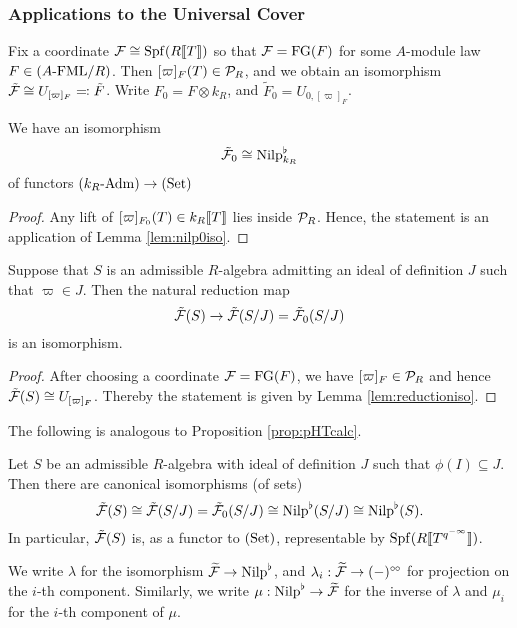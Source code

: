 \documentclass[../main.tex]{subfiles}
\begin{document}
\subsubsection{Applications to the Universal Cover} %
\label{ssub:The Universal Cover}

Fix a coordinate $\mathcal{F} \cong \operatorname{Spf}(R\llbracket T \rrbracket)$ so that $\mathcal{F} = \textnormal{FG}(F)$ for
some $A$-module law $F \in {({A}\text-\allowbreak\mathrm{FML}/{R})}$. Then $[\varpi]_F(T) \in \mathcal{P}_R$, and
we obtain an isomorphism $\tilde {\mathcal{F}} \cong U_{[\varpi]_F} \eqqcolon \tilde F$.
Write $F_0 = F \otimes k_R$, and $\tilde F_0 = U_{0, [\varpi]_F}$. 

\begin{lem}
  We have an isomorphism 
  \begin{equation*}
    \tilde {\mathcal{F}}_0 \cong {\mathrm{Nilp}}^\flat_{k_R}
  \end{equation*}
  of functors ${({k_R}\text-\allowbreak\mathrm{Adm})} \to {(\mathrm{Set})}$
  \begin{proof}
    Any lift of $[\varpi]_{F_0}(T) \in k_R\llbracket T \rrbracket$ lies inside $\mathcal{P}_R$. Hence,
    the statement is an application of Lemma \ref{lem:nilp0iso}.
  \end{proof}
\end{lem}

\begin{lem}
  Suppose that $S$ is an admissible $R$-algebra admitting an ideal of definition
  $J$ such that $\varpi \in J$. Then the natural reduction map
  \begin{equation*}
    \tilde {\mathcal{F}}(S) \to \tilde {\mathcal{F}}(S/J) = \tilde {\mathcal{F}}_0(S/J)
  \end{equation*}
  is an isomorphism.
  \begin{proof}[Proof]
    After choosing a coordinate $\mathcal{F} = \textnormal{FG}(F)$, we have $[\varpi]_F \in \mathcal{P}_R$
    and hence $\tilde {\mathcal{F}}(S) \cong U_{[\varpi]_F}$. Thereby the statement is
    given by Lemma \ref{lem:reductioniso}.
  \end{proof}
\end{lem}

The following is analogous to Proposition \ref{prop:pHTcalc}.
\begin{prop}\label{prop:UnivCoverReductionIso}
  Let $S$ be an admissible $R$-algebra with ideal of definition $J$ such that 
  $\phi(I) \subseteq J$. Then there are canonical isomorphisms (of sets)
  \begin{equation*}
    \tilde {\mathcal{F}}(S) \cong \tilde {\mathcal{F}}(S/J) = \tilde {\mathcal{F}}_0(S/J) \cong {\mathrm{Nilp}}^\flat(S/J) \cong
    {\mathrm{Nilp}}^\flat(S).
  \end{equation*}
  In particular, $\tilde {\mathcal{F}}(S)$ is, as a functor to ${(\mathrm{Set})}$, representable by
  $\operatorname{Spf}(R \llbracket T^{q^{-\infty}} \rrbracket)$.
\end{prop}
We write $\lambda$ for the isomorphism $\widetilde{\mathcal{F}} \to {\mathrm{Nilp}}^\flat$, and
$\lambda_i: \widetilde{\mathcal{F}} \to (-)^{\circ \hspace{-0.5pt} \circ}$ for projection on the $i$-th component.
Similarly, we write $\mu: {\mathrm{Nilp}}^\flat \to \widetilde{\mathcal{F}}$ for the inverse of 
$\lambda$ and $\mu_i$ for the $i$-th component of $\mu$. 
\end{document}
